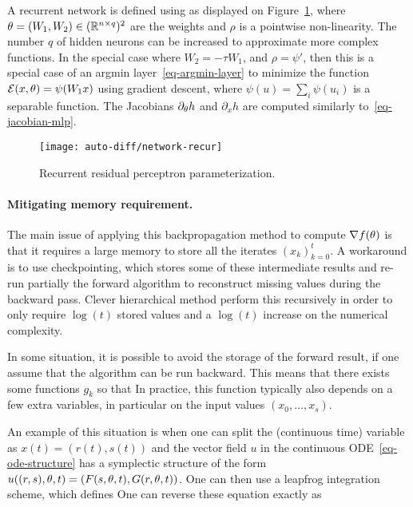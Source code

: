 A recurrent network is defined using
as displayed on Figure~\ref{fig-recurrent-param}, where $\theta = (W_1, W_2) \in (\mathbb{R}^{n \times q})^2$ are the weights and $\rho$ is a pointwise non-linearity. The number $q$ of hidden neurons can be increased to approximate more complex functions. 
%
In the special case where $W_2=- \tau W_1$, and $\rho=\psi'$, then this is a special case of an argmin layer~\eqref{eq-argmin-layer} to minimize the function $\mathcal{E}(x,\theta) = \psi( W_1 x )$ using gradient descent, where $\psi(u)=\sum_i \psi(u_i)$ is a separable function.
%
The Jacobians $\partial_\theta h$ and $\partial_x h$ are computed similarly to~\eqref{eq-jacobian-mlp}.

\begin{figure}
\centering
\texttt{[image: auto-diff/network-recur]} 
\caption{\label{fig-recurrent-param}
Recurrent residual perceptron parameterization.
}
\end{figure}


\paragraph{Mitigating memory requirement. }

The main issue of applying this backpropagation method to compute $\nabla f(\theta)$ is that it requires a large memory to store all the iterates $(x_k)_{k=0}^t$. A workaround is to use checkpointing, which stores some of these intermediate results and re-run partially the forward algorithm to reconstruct missing values during the backward pass. Clever hierarchical method perform this recursively in order to only require $\log(t)$ stored values and a $\log(t)$ increase on the numerical complexity. 

In some situation, it is possible to avoid the storage of the forward result, if one assume that the algorithm can be run backward. This means that there exists some functions $g_k$ so that 
In practice, this function typically also depends on a few extra variables, in particular on the input values $(x_0,\ldots,x_s)$.

An example of this situation is when one can split the (continuous time) variable as $x(t)=(r(t),s(t))$ and the vector field $u$ in the continuous ODE~\eqref{eq-ode-structure} has a symplectic structure of the form $u((r,s),\theta,t) = ( F(s,\theta,t),G(r,\theta,t) )$. One can then use a leapfrog integration scheme, which defines  
One can reverse these equation exactly as

